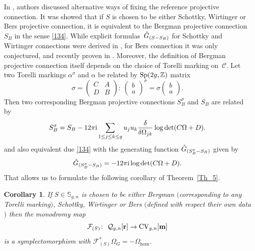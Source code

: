 \documentclass[pdftex]{sigma}
\numberwithin{equation}{section}
\newtheorem{Corollary}[Theorem]{Corollary}
\theoremstyle{definition}
\newcommand{\Z}{\mathbb{Z}}
\begin{document}
In \cite{Bertola_2017}, authors discussed alternative ways of fixing the reference projective connection. It was showed that if $S$ is chosen to be either Schottky, Wirtinger or Bers projective connection, it is equivalent to the Bergman projective connection $S_B$ in the sense \eqref{134}. While explicit formulas~$\Hat{G}_{(S-S_B)}$ for Schottky and Wirtinger connections were derived in \cite{Bertola_2017}, for Bers connection it was only conjectured, and recently proven in \cite{https://doi.org/10.48550/arxiv.2109.02033}. Moreover,
the definition of Bergman projective connection itself depends on the choice of Torelli marking on~$\mathcal{C}.$ Let two Torelli markings $\alpha^\sigma$ and $\alpha$ be related by ${\rm Sp}(2g,\Z)$ matrix
\begin{equation}\label{matrix_hom}
\sigma=\begin{pmatrix}
C & A \\
D & B
\end{pmatrix}\colon \
\begin{pmatrix}
b \\
a
\end{pmatrix}^{\sigma}= \sigma
\begin{pmatrix}
b \\
a
\end{pmatrix}.
\end{equation}
Then two corresponding Bergman projective connections $S^{\sigma}_B$ and $S_B$ are related by
\begin{equation}\label{136}
S^{\sigma}_B=S_B-12 \pi {\rm i} \sum_{1 \leq j \leq k \leq g}u_j u_k \frac{\delta}{\delta \Omega_{jk}}\log \det (C \Omega +D).
\end{equation}
and also equivalent due \eqref{134} with the generating function $\Hat{G}_{(S^{\sigma}_B-S_B)}$ given by
\begin{equation}\label{gen}
\Hat{G}_{(S^{\sigma}_B-S_B)}=-12 \pi {\rm i} \log \det (C \Omega +D).
\end{equation}
That allows us to formulate the following corollary of Theorem~\ref{Th_5}.

\begin{Corollary}
If $S \in \mathbb{S}_{g,n}$ is chosen to be either Bergman $($corresponding to any Torelli marking$)$, Schottky, Wirtinger or Bers $($defined with respect their own data$)$ then the monodromy map
\begin{equation*}%
\mathcal{F}_{(S)}\colon \ \mathcal{Q}_{g,n}[\mathbf{r}] \xrightarrow[]{} {\rm CV}_{g,n}[\mathbf{m}]
\end{equation*} is a symplectomorphism with $\mathcal{F}_{(S)}^*\Omega_G=-\Omega_{\hom}$.
\end{Corollary}
\end{document}
